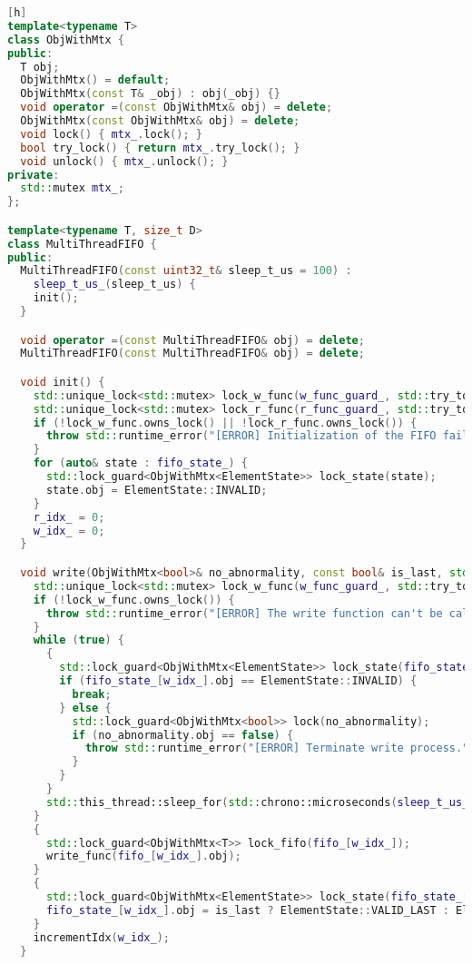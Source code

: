 \documentclass[11pt,a4j]{jarticle}
\begin{document}
\setcounter{lstnumber}{1}
\begin{lstlisting}[language=c++,firstnumber=last,caption=MultiThreadFIFO,label=code:muitithreadfifo][h]
template<typename T>
class ObjWithMtx {
public:
  T obj;
  ObjWithMtx() = default;
  ObjWithMtx(const T& _obj) : obj(_obj) {}
  void operator =(const ObjWithMtx& obj) = delete;
  ObjWithMtx(const ObjWithMtx& obj) = delete;
  void lock() { mtx_.lock(); }
  bool try_lock() { return mtx_.try_lock(); }
  void unlock() { mtx_.unlock(); }
private:
  std::mutex mtx_;
};

template<typename T, size_t D>
class MultiThreadFIFO {
public:
  MultiThreadFIFO(const uint32_t& sleep_t_us = 100) :
    sleep_t_us_(sleep_t_us) {
    init();
  }

  void operator =(const MultiThreadFIFO& obj) = delete;
  MultiThreadFIFO(const MultiThreadFIFO& obj) = delete;

  void init() {
    std::unique_lock<std::mutex> lock_w_func(w_func_guard_, std::try_to_lock);
    std::unique_lock<std::mutex> lock_r_func(r_func_guard_, std::try_to_lock);
    if (!lock_w_func.owns_lock() || !lock_r_func.owns_lock()) {
      throw std::runtime_error("[ERROR] Initialization of the FIFO failed.");
    }
    for (auto& state : fifo_state_) {
      std::lock_guard<ObjWithMtx<ElementState>> lock_state(state);
      state.obj = ElementState::INVALID;
    }
    r_idx_ = 0;
    w_idx_ = 0;
  }

  void write(ObjWithMtx<bool>& no_abnormality, const bool& is_last, std::function<void(T&)> write_func) {
    std::unique_lock<std::mutex> lock_w_func(w_func_guard_, std::try_to_lock);
    if (!lock_w_func.owns_lock()) {
      throw std::runtime_error("[ERROR] The write function can't be called at the same time from multiple threads.");
    }
    while (true) {
      {
        std::lock_guard<ObjWithMtx<ElementState>> lock_state(fifo_state_[w_idx_]);
        if (fifo_state_[w_idx_].obj == ElementState::INVALID) {
          break;
        } else {
          std::lock_guard<ObjWithMtx<bool>> lock(no_abnormality);
          if (no_abnormality.obj == false) {
            throw std::runtime_error("[ERROR] Terminate write process.");
          }
        }
      }
      std::this_thread::sleep_for(std::chrono::microseconds(sleep_t_us_));
    }
    {
      std::lock_guard<ObjWithMtx<T>> lock_fifo(fifo_[w_idx_]);
      write_func(fifo_[w_idx_].obj);
    }
    {
      std::lock_guard<ObjWithMtx<ElementState>> lock_state(fifo_state_[w_idx_]);
      fifo_state_[w_idx_].obj = is_last ? ElementState::VALID_LAST : ElementState::VALID;
    }
    incrementIdx(w_idx_);
  }


\end{lstlisting}
\end{document}
